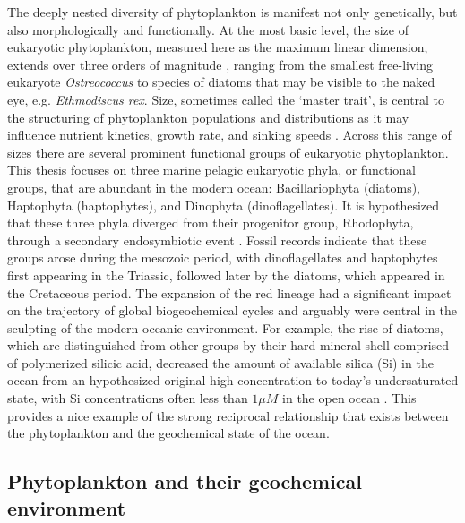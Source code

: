 The deeply nested diversity of phytoplankton is manifest not only genetically, but also morphologically and functionally. At the most basic level, the size of eukaryotic phytoplankton, measured here as the maximum linear dimension, extends over three orders of magnitude \citep{Finkel2010}, ranging from the smallest free-living eukaryote \textit{Ostreococcus} to species of diatoms that may be visible to the naked eye, e.g. \textit{Ethmodiscus rex}. Size, sometimes called the `master trait', is central to the structuring of phytoplankton populations and distributions as it may influence nutrient kinetics, growth rate, and sinking speeds \citep{Finkel2010}. Across this range of sizes there are several prominent functional groups of eukaryotic phytoplankton. This thesis focuses on three marine pelagic eukaryotic phyla, or functional groups, that are abundant in the modern ocean: Bacillariophyta (diatoms), Haptophyta (haptophytes), and Dinophyta (dinoflagellates). It is hypothesized that these three phyla diverged from their progenitor group, Rhodophyta, through a secondary endosymbiotic event \citep{Falkowski2004}. Fossil records indicate that these groups arose during the mesozoic period, with dinoflagellates and haptophytes first appearing in the Triassic, followed later by the diatoms, which appeared in the Cretaceous period\citep{Katz2004}. The expansion of the red lineage had a significant impact on the trajectory of global biogeochemical cycles and arguably were central in the sculpting of the modern oceanic environment. For example, the rise of diatoms, which are distinguished from other groups by their hard mineral shell comprised of polymerized silicic acid,  decreased the amount of available silica (Si) in the ocean from an hypothesized original high concentration to today's undersaturated state, with Si concentrations often less than $1 \mu M$ in the open ocean \citep{Conley2002}. This provides a nice example of the strong reciprocal relationship that exists between the phytoplankton and the geochemical state of the ocean. \par 

\subsection{Phytoplankton and their geochemical environment}

